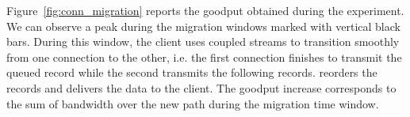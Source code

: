 
Figure~\ref{fig:conn_migration} reports the goodput obtained during the 
experiment. We can observe a peak during the migration windows marked with 
vertical black bars. %
During this window, the client uses coupled streams to transition smoothly from 
one \tcp connection to the other, i.e. the first \tcp connection finishes to 
transmit the queued \tcpls record while the second transmits the following 
records.
\tcpls reorders the records and delivers the data to the 
client. The goodput increase corresponds to the sum of bandwidth over 
the new path during the migration time window.

